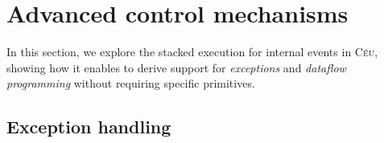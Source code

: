 \documentclass{acm_proc_article-sp}
\newcommand{\CEU}{\textsc{C\'{e}u}\xspace}
\newcommand{\code}[1] {{\small{\texttt{#1}}}}
\newcommand{\1}{\;}
\newcommand{\2}{\;\;}
\newcommand{\3}{\;\;\;}
\newcommand{\5}{\;\;\;\;\;}
\begin{document}

\newpage %
\section{Advanced control mechanisms}
\label{sec.adv}

In this section, we explore the stacked execution for internal events in \CEU, 
showing how it enables to derive support for \emph{exceptions} and 
\emph{dataflow programming} without requiring specific primitives.

\subsection{Exception handling}
\label{sec.adv.excpt}

\end{document}
